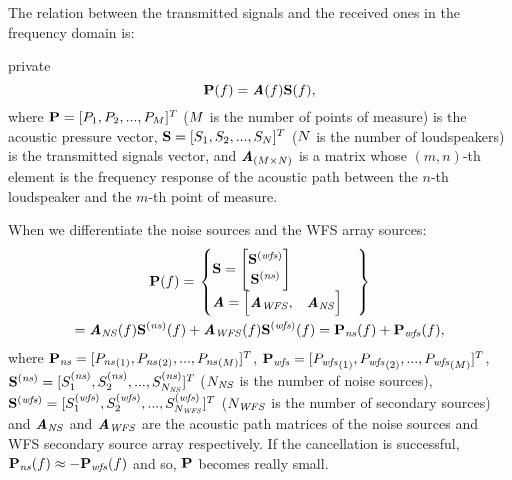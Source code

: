 The relation between the transmitted signals and the received ones in the frequency domain is:
\begin{shownto}{private}
\begin{equation}
\Field[noValue][frequency][vector](f) = \AcPath[mat](f) \vec{\signal[nothing][frequency]}(f) ,
\end{equation}
where $\Field[noValue][frequency][vector] = [\Field[noValue][frequency][scalar]_1, \Field[noValue][frequency][scalar]_2, ..., \Field[noValue][frequency][scalar]_\numMeasPoints]^T$ ($M$ is the number of points of measure) is the acoustic pressure vector, $\vec{\signal[nothing][frequency]} = [\signal[nothing][frequency]_1, \signal[nothing][frequency]_2, ..., \signal[nothing][frequency]_\numSources]^T$ ($N$ is the number of loudspeakers) is the transmitted signals vector, and $\AcPath[mat]_{(\numMeasPoints \times \numSources)}$ is a matrix whose $(m,n)$-th element is the frequency response of the acoustic path between the $n$-th loudspeaker and the $m$-th point of measure.

When we differentiate the noise sources and the WFS array sources:
\begin{multline}
\Field[noValue][frequency][vector](f)
= \left. \begin{cases}
\vec{\signal[nothing][frequency]} = 
\begin{bmatrix}
\vec{\signal[wfs][frequency]} \\
\vec{\signal[ns][frequency]}
\end{bmatrix} \\
\AcPath[mat] =
\begin{bmatrix}
\AcPath[mat][WFS], & \AcPath[mat][NS]
\end{bmatrix}
\end{cases} \right\} \\
 = \AcPath[mat][NS](f) \vec{\signal[ns][frequency]}(f) + \AcPath[mat][WFS](f) \vec{\signal[wfs][frequency]}(f)
 = \Field[ns][frequency][vector](f) + \Field[wfs][frequency][vector](f),
\end{multline}
where $\Field[ns][frequency][vector] = [\Field[ns][frequency][scalar][1], \Field[ns][frequency][scalar][2], ..., \Field[ns][frequency][scalar][\numMeasPoints]]^T$, $\Field[wfs][frequency][vector] = [\Field[wfs][frequency][scalar][1], \Field[wfs][frequency][scalar][2], ..., \Field[wfs][frequency][scalar][\numMeasPoints]]^T$, $\vec{\signal[ns][frequency]} = [\signal[ns][frequency]_1, \signal[ns][frequency]_2, ..., \signal[ns][frequency]_{\numNS}]^T$ ($N_\mathit{NS}$ is the number of noise sources), $\vec{\signal[wfs][frequency]} = [\signal[wfs][frequency]_1, \signal[wfs][frequency]_2, ..., \signal[wfs][frequency]_{\numWFS}]^T$ ($N_\mathit{WFS}$ is the number of secondary sources) and $\AcPath[mat][NS]$ and $\AcPath[mat][WFS]$ are the acoustic path matrices of the noise sources and WFS secondary source array respectively. If the cancellation is successful, $\Field[ns][frequency][vector](f) \approx -\Field[wfs][frequency][vector](f)$ and so, $\Field[noValue][frequency][vector]$ becomes really small.
\end{shownto}


